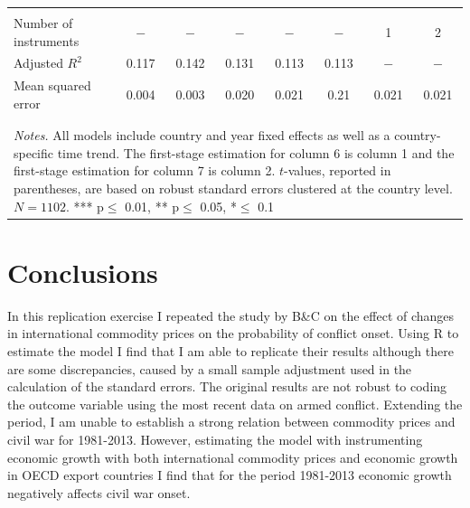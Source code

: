 \documentclass[a4paper,11pt]{article}
\begin{document}
\begin{table}[!h]
{\begin{tabular}{@{\extracolsep{6pt}}lccccccc}
\\[-1.8ex]\\
Number of instruments         & $-$   & $-$        & $-$         & $-$       & $-$       & 1    & 2\\  
Adjusted $R^2$                & 0.117 & 0.142      & 0.131       & 0.113     & 0.113     & $-$  & $-$\\
Mean squared error            & 0.004 & 0.003      & 0.020       & 0.021     & 0.21      & 0.021& 0.021\\
\\[-1.8ex]\hline  
\hline \\[-1.8ex]
\multicolumn{8}{p{20cm}}{\textit{Notes.} All models include country and year fixed effects as well as a country-specific time trend. The first-stage estimation for column 6 is column 1 and the first-stage estimation for column 7 is column 2. $t$-values, reported in parentheses, are based on robust standard errors clustered at the country level. $N=1102$. *** p$\leq$ 0.01, ** p$\leq$ 0.05, *$\leq$ 0.1}
    \end{tabular}}
\end{table}
\section{Conclusions}
In this replication exercise I repeated the study by B\&C on the effect of changes in international commodity prices on the probability of conflict onset. 
Using R to estimate the model I find that I am able to replicate their results although there are some discrepancies, caused by a small sample adjustment used in the calculation of the standard errors.
The original results are not robust to coding the outcome variable using the most recent data on armed conflict. 
Extending the period, I am unable to establish a strong relation between commodity prices and civil war for 1981-2013. 
However, estimating the model with instrumenting economic growth with both international commodity prices and economic growth in OECD export countries I find that for the period 1981-2013 economic growth negatively affects civil war onset. 
\let\oldbibliography\thebibliography
\renewcommand{\thebibliography}[1]{\oldbibliography{#1}
\setlength{\itemsep}{0pt}} %
\def\bibfont{\footnotesize}


\newpage
\appendix
\end{document}
